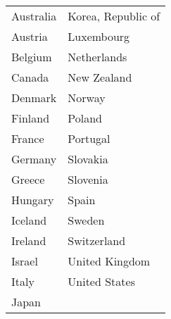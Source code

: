 {\tiny
\begin{tabular}{ll}
  \hline
  \hline
Australia & Korea, Republic of \\ 
  Austria & Luxembourg \\ 
  Belgium & Netherlands \\ 
  Canada & New Zealand \\ 
  Denmark & Norway \\ 
  Finland & Poland \\ 
  France & Portugal \\ 
  Germany & Slovakia \\ 
  Greece & Slovenia \\ 
  Hungary & Spain \\ 
  Iceland & Sweden \\ 
  Ireland & Switzerland \\ 
  Israel & United Kingdom \\ 
  Italy & United States \\ 
  Japan &  \\ 
   \hline
\end{tabular}
}
